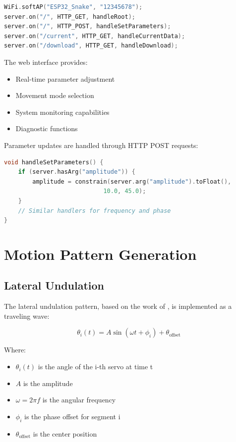\documentclass[12pt,a4paper]{report}
\begin{document}
\begin{lstlisting}[language=C++]
WiFi.softAP("ESP32_Snake", "12345678");
server.on("/", HTTP_GET, handleRoot);
server.on("/", HTTP_POST, handleSetParameters);
server.on("/current", HTTP_GET, handleCurrentData);  
server.on("/download", HTTP_GET, handleDownload);
\end{lstlisting}

The web interface provides:
\begin{itemize}
    \item Real-time parameter adjustment
    \item Movement mode selection
    \item System monitoring capabilities
    \item Diagnostic functions
\end{itemize}

Parameter updates are handled through HTTP POST requests:

\begin{lstlisting}[language=C++]
void handleSetParameters() {
    if (server.hasArg("amplitude")) {
        amplitude = constrain(server.arg("amplitude").toFloat(), 
                            10.0, 45.0);
    }
    // Similar handlers for frequency and phase
}
\end{lstlisting}

\section{Motion Pattern Generation}
\subsection{Lateral Undulation}
The lateral undulation pattern, based on the work of \cite{liljeback-2013}, is implemented as a traveling wave:

\begin{equation}
\theta_i(t) = A \sin(\omega t + \phi_i) + \theta_{\text{offset}}
\end{equation}

Where:
\begin{itemize}
    \item $\theta_i(t)$ is the angle of the i-th servo at time t
    \item $A$ is the amplitude
    \item $\omega = 2\pi f$ is the angular frequency
    \item $\phi_i$ is the phase offset for segment i
    \item $\theta_{\text{offset}}$ is the center position
\end{itemize}
\end{document}
